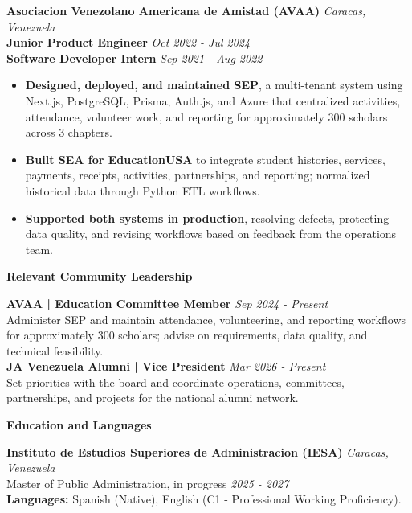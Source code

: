 \documentclass[10pt]{article}
\newcommand{\sectiontitle}[1]{%
    \vspace{4pt}
    \begin{center}
        \textbf{#1}
    \end{center}
    \vspace{-5pt}
}
\begin{document}
\vspace{2pt}
\textbf{Asociacion Venezolano Americana de Amistad (AVAA)} \hfill \textit{Caracas, Venezuela} \\
\textbf{Junior Product Engineer} \hfill \textit{Oct 2022 - Jul 2024} \\
\textbf{Software Developer Intern} \hfill \textit{Sep 2021 - Aug 2022}
\begin{itemize}
    \item \textbf{Designed, deployed, and maintained SEP}, a multi-tenant system using Next.js, PostgreSQL, Prisma, Auth.js, and Azure that centralized activities, attendance, volunteer work, and reporting for approximately 300 scholars across 3 chapters.
    \item \textbf{Built SEA for EducationUSA} to integrate student histories, services, payments, receipts, activities, partnerships, and reporting; normalized historical data through Python ETL workflows.
    \item \textbf{Supported both systems in production}, resolving defects, protecting data quality, and revising workflows based on feedback from the operations team.
\end{itemize}

\sectiontitle{Relevant Community Leadership}
\textbf{AVAA | Education Committee Member} \hfill \textit{Sep 2024 - Present} \\
Administer SEP and maintain attendance, volunteering, and reporting workflows for approximately 300 scholars; advise on requirements, data quality, and technical feasibility. \\
\textbf{JA Venezuela Alumni | Vice President} \hfill \textit{Mar 2026 - Present} \\
Set priorities with the board and coordinate operations, committees, partnerships, and projects for the national alumni network.

\sectiontitle{Education and Languages}
\textbf{Instituto de Estudios Superiores de Administracion (IESA)} \hfill \textit{Caracas, Venezuela} \\
Master of Public Administration, in progress \hfill \textit{2025 - 2027} \\
\textbf{Languages:} Spanish (Native), English (C1 - Professional Working Proficiency).
\end{document}
